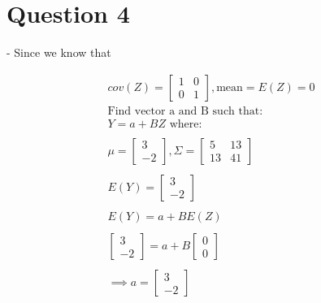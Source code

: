 \documentclass[oneside, a4paper]{article}
\begin{document}
\newpage


\section{Question 4}
- Since we know that 

\begin{equation}
    \begin{split}
        cov(Z) = \begin{bmatrix}
            1 & 0\\
            0 & 1
        \end{bmatrix}, \text{mean} = E(Z) = 0 \\
        \text{Find vector a and B such that:} \\
        Y = a + BZ \text{ where:} \\ \\
        \mu =  \begin{bmatrix}
            3 \\
            -2
        \end{bmatrix}, \Sigma =  \begin{bmatrix}
            5 & 13 \\
            13 & 41
        \end{bmatrix} \\ \\
        E(Y) =  \begin{bmatrix}
            3 \\
            -2 
        \end{bmatrix} \\ \\ 
        E(Y) = a + BE(Z) \\ \\
        \begin{bmatrix}
            3 \\
            -2 
        \end{bmatrix} = a + B \begin{bmatrix}
            0 \\
            0 
        \end{bmatrix} \\ \\ 
        \implies a = \begin{bmatrix}
            3 \\
            -2 
        \end{bmatrix}
    \end{split}
\end{equation}
\end{document}
